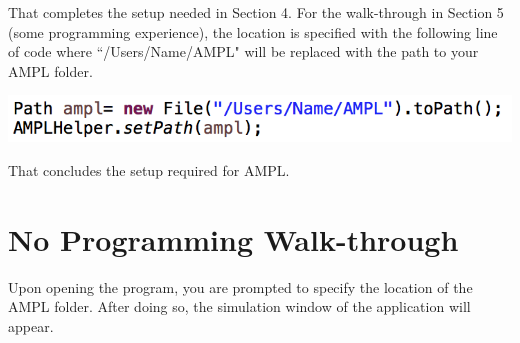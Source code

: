 \documentclass[11 pt]{article}
\begin{document}
 That completes the setup needed in Section 4. For the walk-through in Section 5 (some programming experience), the location is specified with the following line of code where ``/Users/Name/AMPL" will be replaced with the path to your AMPL folder.
 \begin{center}
\includegraphics[scale=0.7]{images/codeAMPLsetup.png}
\end{center}
That concludes the setup required for AMPL. 

\section{No Programming Walk-through}
\par Upon opening the program, you are prompted to specify the location of the AMPL folder. After doing so, the simulation window of the application will appear. 
\newpage
\end{document}
